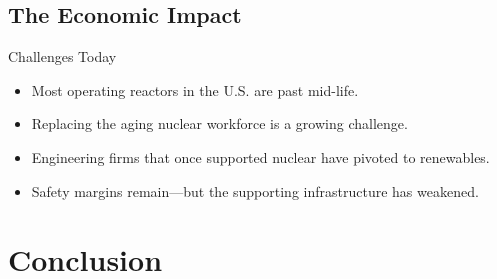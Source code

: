 \documentclass{beamer}
\begin{document}
\subsection{The Economic Impact}
\begin{frame}{Challenges Today}
  \begin{itemize}
    \item Most operating reactors in the U.S. are past mid-life.
    \item Replacing the aging nuclear workforce is a growing challenge.
    \item Engineering firms that once supported nuclear have pivoted to renewables.
    \item Safety margins remain—but the supporting infrastructure has weakened.
  \end{itemize}
\end{frame}

\section{Conclusion}
\end{document}
